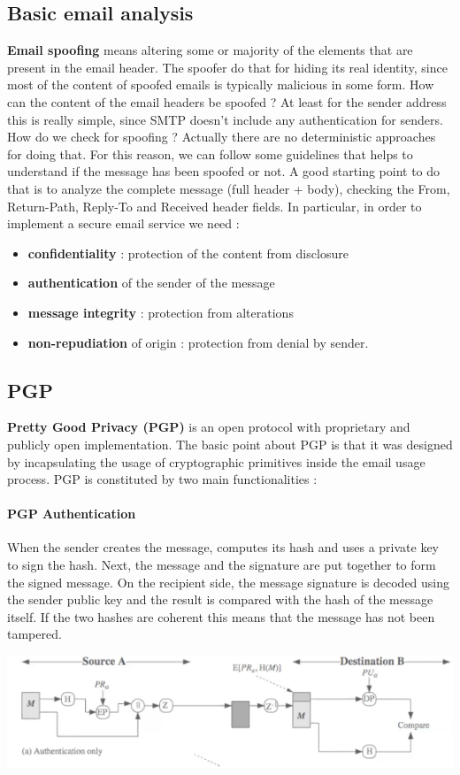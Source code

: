 \subsection{Basic email analysis}
\textbf{Email spoofing} means altering some or majority of the elements that are present in the email header. The spoofer do that for hiding its real identity, since most of the content of spoofed emails is typically malicious in some form. How can the content of the email headers be spoofed ? At least for the sender address this is really simple, since SMTP doesn't include any authentication for senders. How do we check for spoofing ? Actually there are no deterministic approaches for doing that. For this reason, we can follow some guidelines that helps to understand if the message has been spoofed or not. A good starting point to do that is to analyze the complete message (full header + body), checking the From, Return-Path, Reply-To and Received header fields. In particular, in order to implement a secure email service we need :
\begin{itemize}
\item \textbf{confidentiality} : protection of the content from disclosure
\item \textbf{authentication} of the sender of the message
\item \textbf{message integrity} : protection from alterations
\item \textbf{non-repudiation} of origin : protection from denial by sender. 
\end{itemize}
\subsection{PGP}
\textbf{Pretty Good Privacy (PGP)} is an open protocol with proprietary and publicly open implementation. The basic point about PGP is that it was designed by incapsulating the usage of cryptographic primitives inside the email usage process. PGP is constituted by two main functionalities :

\paragraph{PGP Authentication} When the sender creates the message, computes its hash and uses a private key to sign the hash. Next, the message and the signature are put together to form the signed message. On the recipient side, the message signature is decoded using the sender public key and the result is compared with the hash of the message itself. If the two hashes are coherent this means that the message has not been tampered.
\begin{center}
\includegraphics[scale=0.5]{./images/pgp_authentication.png}
\end{center}

